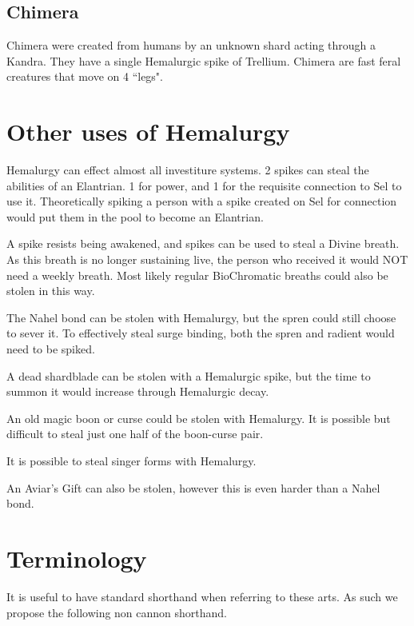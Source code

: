 \documentclass[conference]{IEEEtran}
\begin{document}
\subsection*{Chimera}
Chimera\cite{chimera} were created from humans by an unknown shard acting through a Kandra.  They have a single Hemalurgic spike of Trellium.
Chimera are fast feral creatures that move on 4 ``legs".\cite{SoS-CH21}

\section*{Other uses of Hemalurgy}
Hemalurgy can effect almost all investiture systems.\cite{HE-universal}  2 spikes can steal the abilities of an Elantrian.  1 for power, and 1 for the requisite connection to Sel to use it.\cite{HE-elantrian}  Theoretically spiking a person with a spike created on Sel for connection would put them in the pool to become an Elantrian.\cite{HE-pool}

A spike resists being awakened,\cite{HE-awake} and spikes can be used to steal a Divine breath.\cite{HE-DB}  As this breath is no longer sustaining live, the person who received it would NOT need a weekly breath.\cite{HE-DB-life}  Most likely regular BioChromatic breaths could also be stolen in this way.\cite{PvAvI}

The Nahel bond can be stolen with Hemalurgy, but the spren could still choose to sever it.  To effectively steal surge binding, both the spren and radient would need to be spiked.\cite{HE-Aviar} 

A dead shardblade can be stolen with a Hemalurgic spike,\cite{HE-blade} but the time to summon it would increase through Hemalurgic decay.\cite{HE-blade}

An old magic boon or curse could be stolen with Hemalurgy.  It is possible but difficult to steal just one half of the boon-curse pair.\cite{HE-Old}

It is possible to steal singer forms with Hemalurgy. \cite{HE-singer}

An Aviar's Gift can also be stolen, however this is even harder than a Nahel bond.\cite{HE-Aviar} 

\section*{Terminology}
It is useful to have standard shorthand when referring to these arts.  As such we propose the following non cannon shorthand.\\
\end{document}
